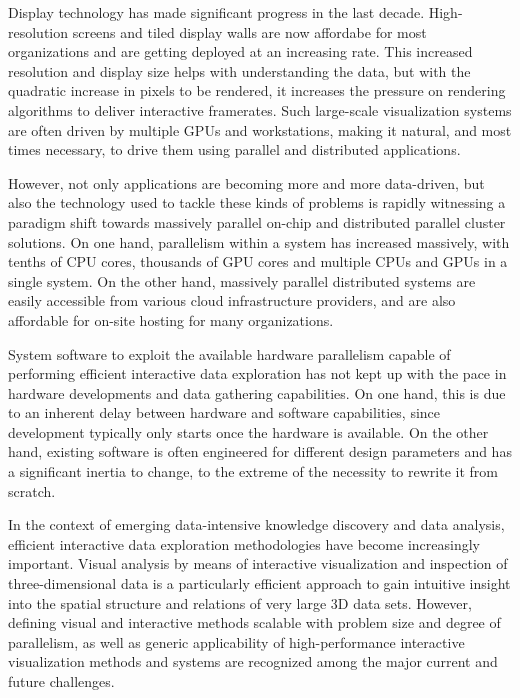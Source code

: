 Display technology has made significant progress in the last decade.
High-resolution screens and tiled display walls are now affordabe for most
organizations and are getting deployed at an increasing rate. This increased
resolution and display size helps with understanding the data, but with the
quadratic increase in pixels to be rendered, it increases the pressure on
rendering algorithms to deliver interactive framerates. Such large-scale
visualization systems are often driven by multiple GPUs and workstations,
making it natural, and most times necessary, to drive them using parallel and
distributed applications.

However, not only applications are becoming more and more data-driven, but also
the technology used to tackle these kinds of problems is rapidly witnessing a
paradigm shift towards massively parallel on-chip and distributed parallel
cluster solutions. On one hand, parallelism within a system has increased
massively, with tenths of CPU cores, thousands of GPU cores and multiple CPUs
and GPUs in a single system. On the other hand, massively parallel distributed
systems are easily accessible from various cloud infrastructure providers, and
are also affordable for on-site hosting for many organizations.

System software to exploit the available hardware parallelism capable of
performing efficient interactive data exploration has not kept up with the pace
in hardware developments and data gathering capabilities. On one hand, this is
due to an inherent delay between hardware and software capabilities, since
development typically only starts once the hardware is available. On the other
hand, existing software is often engineered for different design parameters and
has a significant inertia to change, to the extreme of the necessity to rewrite
it from scratch.

In the context of emerging data-intensive knowledge discovery and data analysis,
efficient interactive data exploration methodologies have become increasingly
important. Visual analysis by means of interactive visualization and inspection
of three-dimensional data is a particularly efficient approach to gain intuitive
insight into the spatial structure and relations of very large 3D data sets.
However, defining visual and interactive methods scalable with problem size and
degree of parallelism, as well as generic applicability of high-performance
interactive visualization methods and systems are recognized among the major
current and future challenges.

